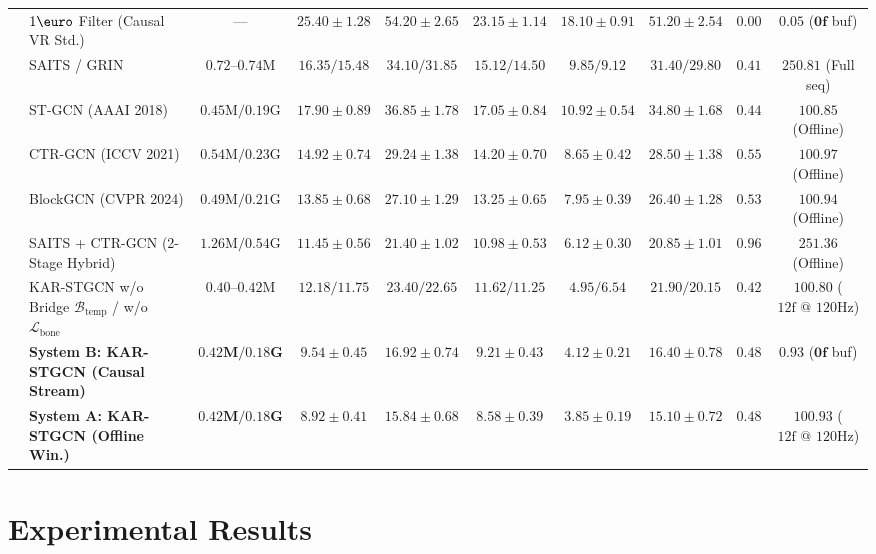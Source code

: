 \documentclass[10pt,twocolumn]{article}
\begin{document}
\begin{table}[!t]
{\begin{tabular}{llcccccccc}
& $1\text{\euro}$ Filter \cite{casiez20121euro} (Causal VR Std.) & --- & $25.40 \pm 1.28$ & $54.20 \pm 2.65$ & $23.15 \pm 1.14$ & $18.10 \pm 0.91$ & $51.20 \pm 2.54$ & $0.00$ & $\mathbf{0.05}$ ($\mathbf{0\text{f}}$ buf) \\
& SAITS \cite{du2023saits} / GRIN \cite{cini2022filling} & $0.72\text{--}0.74\text{M}$ & $16.35 / 15.48$ & $34.10 / 31.85$ & $15.12 / 14.50$ & $9.85 / 9.12$ & $31.40 / 29.80$ & $0.41$ & $250.81$ (Full seq) \\
& ST-GCN \cite{yan2018spatial} (AAAI 2018) & $0.45\text{M} / 0.19\text{G}$ & $17.90 \pm 0.89$ & $36.85 \pm 1.78$ & $17.05 \pm 0.84$ & $10.92 \pm 0.54$ & $34.80 \pm 1.68$ & $0.44$ & $100.85$ (Offline) \\
& CTR-GCN \cite{chen2021channel} (ICCV 2021) & $0.54\text{M} / 0.23\text{G}$ & $14.92 \pm 0.74$ & $29.24 \pm 1.38$ & $14.20 \pm 0.70$ & $8.65 \pm 0.42$ & $28.50 \pm 1.38$ & $0.55$ & $100.97$ (Offline) \\
& BlockGCN \cite{zhou2024blockgcn} (CVPR 2024) & $0.49\text{M} / 0.21\text{G}$ & $13.85 \pm 0.68$ & $27.10 \pm 1.29$ & $13.25 \pm 0.65$ & $7.95 \pm 0.39$ & $26.40 \pm 1.28$ & $0.53$ & $100.94$ (Offline) \\
& SAITS + CTR-GCN (2-Stage Hybrid) & $1.26\text{M} / 0.54\text{G}$ & $11.45 \pm 0.56$ & $21.40 \pm 1.02$ & $10.98 \pm 0.53$ & $6.12 \pm 0.30$ & $20.85 \pm 1.01$ & $0.96$ & $251.36$ (Offline) \\
& KAR-STGCN w/o Bridge $\mathcal{B}_{\text{temp}}$ / w/o $\mathcal{L}_{\text{bone}}$ & $0.40\text{--}0.42\text{M}$ & $12.18 / 11.75$ & $23.40 / 22.65$ & $11.62 / 11.25$ & $4.95 / 6.54$ & $21.90 / 20.15$ & $0.42$ & $100.80$ ($12\text{f @ 120Hz}$) \\
& \textbf{System B: KAR-STGCN (Causal Stream)} & $\mathbf{0.42\text{M} / 0.18\text{G}}$ & $9.54 \pm 0.45$ & $16.92 \pm 0.74$ & $9.21 \pm 0.43$ & $4.12 \pm 0.21$ & $16.40 \pm 0.78$ & $0.48$ & $\mathbf{0.93}$ ($\mathbf{0\text{f}}$ buf) \\
& \textbf{System A: KAR-STGCN (Offline Win.)} & $\mathbf{0.42\text{M} / 0.18\text{G}}$ & $\mathbf{8.92 \pm 0.41}$ & $\mathbf{15.84 \pm 0.68}$ & $\mathbf{8.58 \pm 0.39}$ & $\mathbf{3.85 \pm 0.19}$ & $\mathbf{15.10 \pm 0.72}$ & $0.48$ & $100.93$ ($12\text{f @ 120Hz}$) \\
\bottomrule
\end{tabular}
}
\end{table}

\section{Experimental Results}
\end{document}
